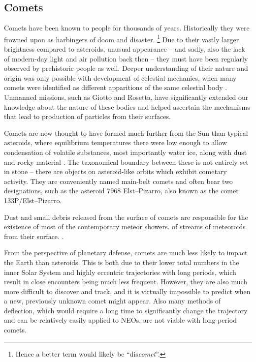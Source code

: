     \subsection{Comets} \label{iac}
        Comets have been known to people for thousands of years. Historically they were
        frowned upon as harbingers of doom and disaster.%
        \footnote{Hence a better term would likely be ``dis\textit{comet}''.}
        Due to their vastly larger brightness compared to asteroids, unusual appearance -- and sadly, also the
        lack of modern-day light and air pollution back then -- they must have been regularly observed by prehistoric people as well.
        Deeper understanding of their nature and origin was only possible with development of celestial mechanics,
        when many comets were identified as different apparitions of the same celestial body \citep{nasa-halley}.
        Unmanned missions, such as Giotto and Rosetta, have significantly extended our knowledge
        about the nature of these bodies and helped ascertain the mechanisms that lead to production of particles from their surfaces.

        Comets are now thought to have formed much further from the Sun than typical asteroids,
        where equilibrium temperatures there were low enough to allow condensation of volatile substances, most importantly water ice,
        along with dust and rocky material \citep{???}. 
        The taxonomical boundary between these is not entirely set in stone -- there
        are objects on asteroid-like orbits which exhibit cometary activity.
        They are conveniently named main-belt comets and often bear two designations, such as the asteroid 7968 Elst--Pizarro,
        also known as the comet 133P/Elst--Pizarro.

        Dust and small debris released from the surface of comets are responsible
        for the existence of most of the contemporary meteor showers.
        of streams of meteoroids from their surface. \citep{???}. 

        From the perspective of planetary defense, comets are much less likely to impact the Earth
        than asteroids. This is both due to their lower total numbers in the inner Solar System
        and highly eccentric trajectories with long periods, which result in close encounters being much less frequent.
        However, they are also much more difficult to discover and track, and it is virtually impossible
        to predict when a new, previously unknown comet might appear.
        Also many methods of deflection, which would require a long time to significantly change the trajectory and
        can be relatively easily applied to NEOs, are not viable with long-period comets.

